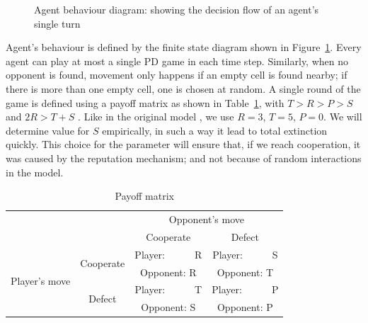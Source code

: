 \documentclass[runningheads]{llncs}
\begin{document}
\begin{figure}[h]
  \centering
  \caption{Agent behaviour diagram: showing the decision flow of an agent's single turn}
  \label{fig:agent_behaviour}
\end{figure}

Agent's behaviour is defined by the finite state diagram shown in Figure~\ref{fig:agent_behaviour}.
Every agent can play at most a single PD game in each time step.
Similarly, when no opponent is found, movement only happens if an empty cell is found nearby; if there is more than one empty cell, one is chosen at random.
A single round of the game is defined using a payoff matrix as shown in Table~\ref{table:payoff}, with $T > R > P > S$ and $2R > T + S$ \cite{chammah1965}.
Like in the original model \cite{smaldino},
we use $R = 3$, $T = 5$, $P = 0$.
We will determine value for $S$ empirically, in such a way it lead to total extinction quickly. This choice for the parameter will ensure that, if we reach cooperation, it was caused by the reputation mechanism;
and not because of random interactions in the model.

\begin{table}[h!]
  \caption{Payoff matrix}
  \label{table:payoff}

  \centering
  \begin{tabular}{c c||c|c}
    & & \multicolumn{2}{c}{Opponent's move} \\
    & & Cooperate & Defect \\
    \hline\hline

    \multirow{4}{6em}{Player's move}
    & \multirow{2}{5em}{Cooperate}
      & Player:\ \ \ \ \ \ R & Player:\ \ \ \ \ \ S \\
    & & Opponent: R & Opponent: T \\
    \cline{2-4}
    & \multirow{2}{5em}{Defect}
      & Player:\ \ \ \ \ \ T & Player:\ \ \ \ \ \ P \\
    & & Opponent: S & Opponent: P \\
  \end{tabular}
\end{table}
\end{document}
